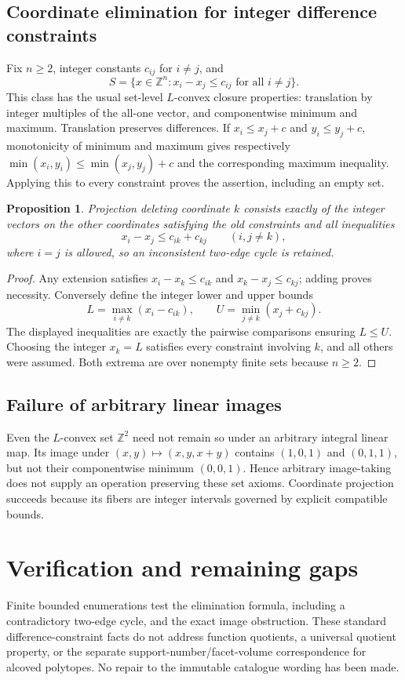 \documentclass[11pt]{article}
\newtheorem{proposition}{Proposition}
\begin{document}
\subsection{Coordinate elimination for integer difference constraints}
Fix $n\ge2$, integer constants $c_{ij}$ for $i\ne j$, and
\[
 S=\{x\in\mathbb Z^n:x_i-x_j\le c_{ij}\text{ for all }i\ne j\}.
\]
This class has the usual set-level $L$-convex closure properties: translation by integer multiples of the all-one vector, and componentwise minimum and maximum. Translation preserves differences. If $x_i\le x_j+c$ and $y_i\le y_j+c$, monotonicity of minimum and maximum gives respectively $\min(x_i,y_i)\le\min(x_j,y_j)+c$ and the corresponding maximum inequality. Applying this to every constraint proves the assertion, including an empty set.
\begin{proposition}
Projection deleting coordinate $k$ consists exactly of the integer vectors on the other coordinates satisfying the old constraints and all inequalities
\[
 x_i-x_j\le c_{ik}+c_{kj}\qquad(i,j\ne k),
\]
where $i=j$ is allowed, so an inconsistent two-edge cycle is retained.
\end{proposition}
\begin{proof}
Any extension satisfies $x_i-x_k\le c_{ik}$ and $x_k-x_j\le c_{kj}$; adding proves necessity. Conversely define the integer lower and upper bounds
\[
 L=\max_{i\ne k}(x_i-c_{ik}),\qquad U=\min_{j\ne k}(x_j+c_{kj}).
\]
The displayed inequalities are exactly the pairwise comparisons ensuring $L\le U$. Choosing the integer $x_k=L$ satisfies every constraint involving $k$, and all others were assumed. Both extrema are over nonempty finite sets because $n\ge2$.
\end{proof}
\subsection{Failure of arbitrary linear images}
Even the $L$-convex set $\mathbb Z^2$ need not remain so under an arbitrary integral linear map. Its image under $(x,y)\mapsto(x,y,x+y)$ contains $(1,0,1)$ and $(0,1,1)$, but not their componentwise minimum $(0,0,1)$. Hence arbitrary image-taking does not supply an operation preserving these set axioms. Coordinate projection succeeds because its fibers are integer intervals governed by explicit compatible bounds.
\section{Verification and remaining gaps}
Finite bounded enumerations test the elimination formula, including a contradictory two-edge cycle, and the exact image obstruction. These standard difference-constraint facts do not address function quotients, a universal quotient property, or the separate support-number/facet-volume correspondence for alcoved polytopes. No repair to the immutable catalogue wording has been made.
\end{document}

